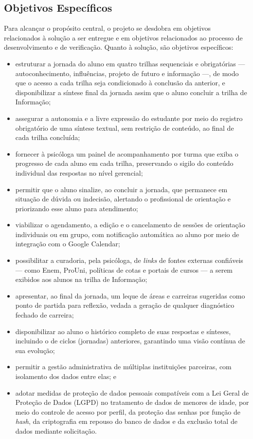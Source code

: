 \subsection{Objetivos Específicos}

Para alcançar o propósito central, o projeto se desdobra em objetivos relacionados à solução a ser entregue e em objetivos relacionados ao processo de desenvolvimento e de verificação. Quanto à solução, são objetivos específicos:

\begin{itemize}
    \item estruturar a jornada do aluno em quatro trilhas sequenciais e obrigatórias --- autoconhecimento, influências, projeto de futuro e informação ---, de modo que o acesso a cada trilha seja condicionado à conclusão da anterior, e disponibilizar a síntese final da jornada assim que o aluno concluir a trilha de Informação;
    \item assegurar a autonomia e a livre expressão do estudante por meio do registro obrigatório de uma síntese textual, sem restrição de conteúdo, ao final de cada trilha concluída;
    \item fornecer à psicóloga um painel de acompanhamento por turma que exiba o progresso de cada aluno em cada trilha, preservando o sigilo do conteúdo individual das respostas no nível gerencial;
    \item permitir que o aluno sinalize, ao concluir a jornada, que permanece em situação de dúvida ou indecisão, alertando o profissional de orientação e priorizando esse aluno para atendimento;
    \item viabilizar o agendamento, a edição e o cancelamento de sessões de orientação individuais ou em grupo, com notificação automática ao aluno por meio de integração com o Google Calendar;
    \item possibilitar a curadoria, pela psicóloga, de \textit{links} de fontes externas confiáveis --- como Enem, ProUni, políticas de cotas e portais de cursos --- a serem exibidos aos alunos na trilha de Informação;
    \item apresentar, ao final da jornada, um leque de áreas e carreiras sugeridas como ponto de partida para reflexão, vedada a geração de qualquer diagnóstico fechado de carreira;
    \item disponibilizar ao aluno o histórico completo de suas respostas e sínteses, incluindo o de ciclos (jornadas) anteriores, garantindo uma visão contínua de sua evolução;
    \item permitir a gestão administrativa de múltiplas instituições parceiras, com isolamento dos dados entre elas; e
    \item adotar medidas de proteção de dados pessoais compatíveis com a Lei Geral de Proteção de Dados (LGPD) no tratamento de dados de menores de idade, por meio do controle de acesso por perfil, da proteção das senhas por função de \textit{hash}, da criptografia em repouso do banco de dados e da exclusão total de dados mediante solicitação.
\end{itemize}

